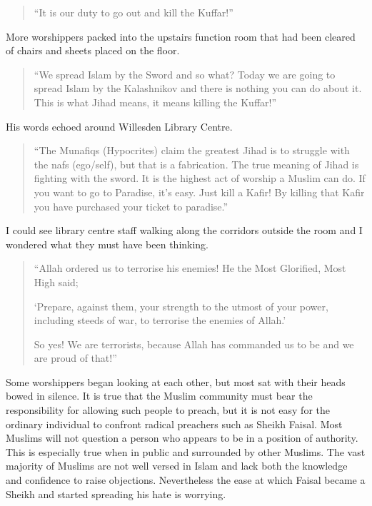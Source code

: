 \documentclass[12pt]{memoir}
\def\/{\hskip0pt/\hskip0pt}
\begin{document}
\begin{quote}
“It is our duty to go out and kill the Kuffar!”
\end{quote}

More worshippers packed into the upstairs function room
that had been cleared of chairs and sheets placed on the floor.

\begin{quote}
“We spread Islam by the Sword and so what? Today we are going to spread
Islam by the Kalashnikov and there is nothing you can do about it.
This is what Jihad means, it means killing the Kuffar!”
\end{quote}

His words echoed around Willesden Library Centre.

\begin{quote}
“The Munafiqs (Hypocrites) claim the greatest Jihad is to struggle
with the nafs (ego\/self), but that is a fabrication.
The true meaning of Jihad is fighting with the sword.
It is the highest act of worship a Muslim can do.
If you want to go to Paradise, it’s easy.
Just kill a Kafir!
By killing that Kafir you have purchased your ticket to paradise.”
\end{quote}

I could see library centre staff walking along the corridors outside the room
and I wondered what they must have been thinking.

\begin{quote}
“Allah ordered us to terrorise his enemies!
He the Most Glorified, Most High said;

‘Prepare, against them, your strength to the utmost of your power,
including steeds of war, to terrorise the enemies of Allah.’

So yes! We are terrorists, because Allah has commanded us
to be and we are proud of that!”
\end{quote}

Some worshippers began looking at each other,
but most sat with their heads bowed in silence.
It is true that the Muslim community must bear the responsibility
for allowing such people to preach,
but it is not easy for the ordinary individual
to confront radical preachers such as Sheikh Faisal.
Most Muslims will not question a person
who appears to be in a position of authority.
This is especially true when in public and surrounded by other Muslims.
The vast majority of Muslims are not well versed in Islam
and lack both the knowledge and confidence to raise objections.
Nevertheless the ease at which Faisal became a Sheikh
and started spreading his hate is worrying.
\end{document}
